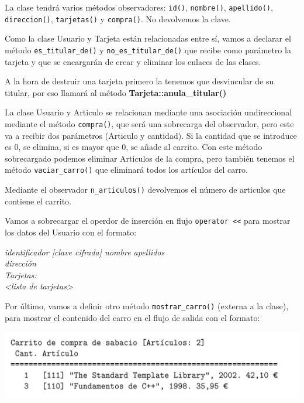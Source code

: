 La clase tendrá varios métodos observadores: \texttt{id()}, \texttt{nombre()}, \texttt{apellido()}, \texttt{direccion()}, \texttt{tarjetas()} y \texttt{compra()}. No devolvemos la clave.

Como la clase Usuario y Tarjeta están relacionadas entre sí, vamos a declarar el método \texttt{es\_titular\_de()} y \texttt{no\_es\_titular\_de()} que recibe como parámetro la tarjeta y que se encargarán de crear y eliminar los enlaces de las clases.

A la hora de destruir una tarjeta primero la tenemos que desvincular de su titular, por eso llamará al método \textbf{Tarjeta::anula\_titular()}

La clase Usuario y Articulo se relacionan mediante una asociación undireccional mediante el método \texttt{compra()}, que será una sobrecarga del observador, pero este va a recibir dos parámetros (Articulo y cantidad). Si la cantidad que se introduce es 0, se elimina, si es mayor que 0, se añade al carrito.
Con este método sobrecargado podemos eliminar Articulos de la compra, pero también tenemos el método \texttt{vaciar\_carro()} que eliminará todos los artículos del carro.

Mediante el observador \texttt{n\_articulos()} devolvemos el número de articulos que contiene el carrito.

Vamos a sobrecargar el operdor de inserción en flujo \texttt{operator <<} para mostrar los datos del Usuario con el formato:

    \textit{identificador [clave cifrada] nombre apellidos}\\
    \textit{dirección}\\
    \textit{Tarjetas:}\\
    \textit{\textless lista de tarjetas\textgreater}


Por último, vamos a definir otro método \texttt{mostrar\_carro()} (externa a la clase), para mostrar el contenido del carro en el flujo de salida con el formato:
\begin{center}
    \includegraphics[width=\textwidth]{Pics/P2_3.png}
\end{center}

\newpage
